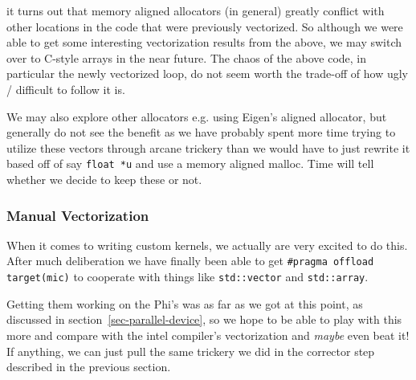 it turns out that memory aligned allocators (in general) greatly conflict with other locations in the code that were previously vectorized.  So although we were able to get some interesting vectorization results from the above, we may switch over to C-style arrays in the near future.  The chaos of the above code, in particular the newly vectorized loop, do not seem worth the trade-off of how ugly / difficult to follow it is.

We may also explore other allocators e.g. using Eigen's aligned allocator, but generally do not see the benefit as we have probably spent more time trying to utilize these vectors through arcane trickery than we would have to just rewrite it based off of say \texttt{float *u} and use a memory aligned malloc.  Time will tell whether we decide to keep these or not.

\subsubsection{Manual Vectorization}
\label{sec-tune-vectorizing-manual-vectorization}

When it comes to writing custom kernels, we actually are very excited to do this.  After much deliberation we have finally been able to get \texttt{\#pragma offload target(mic)} to cooperate with things like \texttt{std::vector} and \texttt{std::array}.

Getting them working on the Phi's was as far as we got at this point, as discussed in section~\ref{sec-parallel-device}, so we hope to be able to play with this more and compare with the intel compiler's vectorization and \emph{maybe} even beat it!  If anything, we can just pull the same trickery we did in the corrector step described in the previous section.




